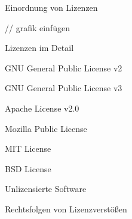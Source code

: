 \documentclass{beamer}
\begin{document}
\begin{frame}
	\Large{Einordnung von Lizenzen}

	// grafik einfügen
\end{frame}

\begin{frame}
	\Large{Lizenzen im Detail}
\end{frame}

\begin{frame}
	\Large{GNU General Public License v2}
\end{frame}

\begin{frame}
	\Large{GNU General Public License v3}
\end{frame}

\begin{frame}
	\Large{Apache License v2.0}
\end{frame}

\begin{frame}
	\Large{Mozilla Public License}
\end{frame}

\begin{frame}
	\Large{MIT License}
\end{frame}

\begin{frame}
	\Large{BSD License}
\end{frame}

\begin{frame}
	\Large{Unlizensierte Software}
\end{frame}

\begin{frame}
	\Large{Rechtsfolgen von Lizenzverstößen}
\end{frame}



\end{document}
